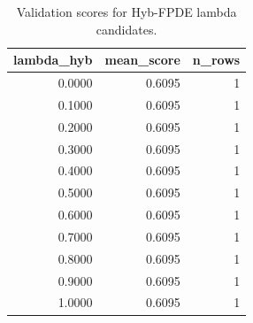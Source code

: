 \begin{table}[t]
\caption{Validation scores for Hyb-FPDE lambda candidates.}
\label{tab:lambda_distribution_computed}
\centering
\begin{tabular}{rrr}
\toprule
lambda\_hyb & mean\_score & n\_rows \\
\midrule
0.0000 & 0.6095 & 1 \\
0.1000 & 0.6095 & 1 \\
0.2000 & 0.6095 & 1 \\
0.3000 & 0.6095 & 1 \\
0.4000 & 0.6095 & 1 \\
0.5000 & 0.6095 & 1 \\
0.6000 & 0.6095 & 1 \\
0.7000 & 0.6095 & 1 \\
0.8000 & 0.6095 & 1 \\
0.9000 & 0.6095 & 1 \\
1.0000 & 0.6095 & 1 \\
\bottomrule
\end{tabular}

\end{table}
